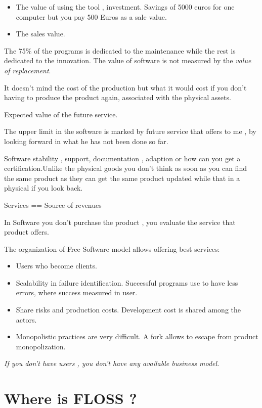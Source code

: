 \begin{itemize}
    \item The value of using the tool , investment.
    Savings of 5000 euros  for one computer but you pay 500 Euros as a sale
    value.
    \item The sales value.
\end{itemize}


The 75\% of the programs is dedicated to the maintenance while the rest is
dedicated to the innovation.
The value of software is not measured by the \emph{value of replacement}. 

It doesn't mind the cost of the production but what it would cost if you don't
having to produce the product again, associated with the physical assets.


Expected value of the future service.

The upper limit in the software is marked by future service that offers to me ,
by looking forward in what he has not been done so far.

Software stability , support, documentation , adaption or how can you get a
certification.Unlike the physical goods you don't think as soon as you can find
the same product as they can get the same product updated while that in a
physical if you look back.

    Services == Source of revenues

In Software you don't purchase the product , you evaluate the service that product offers.

The organization of Free Software model allows offering best services:
\begin{itemize}
    \item Users who become clients.
    \item Scalability in failure identification. Successful programs use to have less errors, where success measured in user.
    \item Share risks and production costs. Development cost is shared among the actors.
    \item Monopolistic practices are very difficult. A fork allows to escape from product monopolization.
\end{itemize}

\emph{If you don't have users , you don't have any available business model.}

\section{Where is FLOSS ?}\label{sec:floss-bm}

